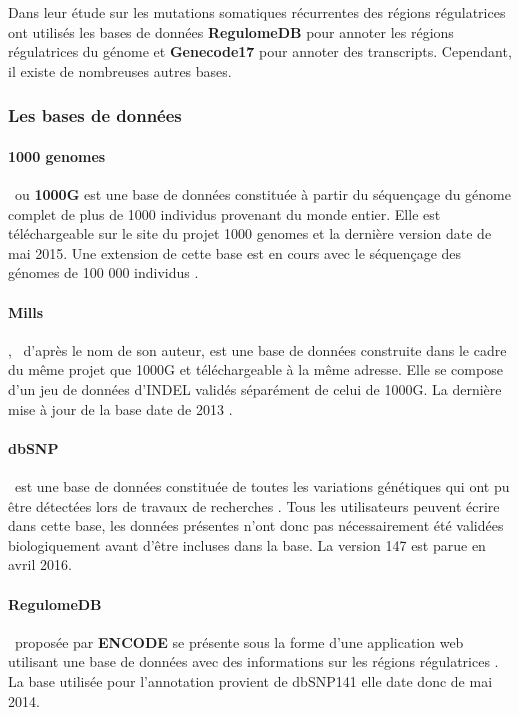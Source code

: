 Dans leur étude sur les mutations somatiques récurrentes des régions régulatrices \citet{Melton} ont utilisés les bases de données \textbf{RegulomeDB} pour annoter les régions régulatrices du génome et \textbf{Genecode17} pour annoter des transcripts. Cependant, il existe de nombreuses autres bases.

\subsubsection{Les bases de données}\label{subsec:bdd}
\paragraph{1000 genomes} ~ou \textbf{1000G} est une base de données constituée à partir du séquençage du génome complet de plus de 1000 individus \citep{1000} provenant du monde entier. Elle est téléchargeable sur le site du projet 1000 genomes \citep{genome} et la dernière version date de mai 2015. Une extension de cette base est en cours avec le séquençage des génomes de 100 000 individus \citep{100000}. 

\paragraph{Mills}, ~d'après le nom de son auteur, est une base de données construite dans le cadre du même projet que 1000G et téléchargeable à la même adresse. Elle se compose d'un jeu de données d'INDEL validés séparément de celui de 1000G. La dernière mise à jour de la base date de 2013 \citep{mills}.

\paragraph{dbSNP} ~est une base de données constituée de toutes les variations génétiques qui ont pu être détectées lors de travaux de recherches \citep{dbsnp}. Tous les utilisateurs peuvent écrire dans cette base, les données présentes n'ont donc pas nécessairement été validées biologiquement avant d'être incluses dans la base. La version 147 est parue en avril 2016.

\paragraph{RegulomeDB} ~proposée par \textbf{ENCODE} se présente sous la forme d'une application web utilisant une base de données avec des informations sur les régions régulatrices \citep{Regulome}. La base utilisée pour l'annotation provient de dbSNP141 elle date donc de mai 2014.

